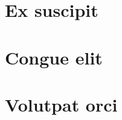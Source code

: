   
  

  \hbAppendix


  \section{Ex suscipit} \lipsum[126]
  \section{Congue elit} \lipsum[128-129]
  \section{Volutpat orci} \lipsum[130-131]

  \backmatter

   \lipsum[127]

  \renewcommand{\hbBackcoverHeader}{Back Cover \protect\\ Placeholder Title}
  \renewcommand{\hbBackcoverClose}{For use the the 5th edition rulebooks. Created by Artefact2, typeset with \XeTeX.}
  \renewcommand{\hbBackcoverLink}{\normalsize\url{https://github.com/Artefact2/texbrew/}}
  \renewcommand*{\hbBackcover}{assets/samples/cover}
  \renewcommand*{\hbBackcoverLogo}{assets/dnd-logo-initials}
  \renewcommand{\hbBackcoverContent}{\lipsum[2]}
  \hbMakeBackcover


